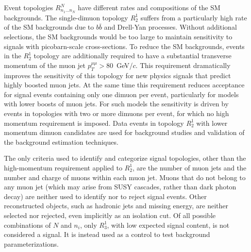 Event topologies $R^{N}_{n_1 ... n_N}$ have different rates and compositions of the SM backgrounds. The single-dimuon topology $R^1_2$ suffers from a particularly high rate of the SM backgrounds due to $b\bar{b}$ and Drell-Yan processes. Without additional selections, the SM backgrounds would be too large to maintain sensitivity to signals with picobarn-scale cross-sections. To reduce the SM backgrounds, events in the $R^1_2$ topology are additionally required to have a substantial transverse momentum of the muon jet $p_T^{\mu\mu}>80$~GeV/$c$. This requirement dramatically improves the sensitivity of this topology for new physics signals that predict highly boosted muon jets. At the same time this requirement reduces acceptance for signal events containing only one dimuon per event, particularly for models with lower boosts of muon jets. For such models the sensitivity is driven by events in topologies with two or more dimuons per event, for which no high momentum requirement is imposed. Data events in topology $R^1_2$ with lower momentum dimuon candidates are used for background studies and validation of the background estimation techniques. 

The only criteria used to identify and categorize signal topologies, other than the high-momentum requirement applied to $R^1_2$, are the number of muon jets and the number and charge of muons within each muon jet.  Muons that do not belong to any muon jet (which may arise from SUSY cascades, rather than dark photon decay) are neither used to identify nor to reject signal events.  Other reconstructed objects, such as hadronic jets and missing energy, are neither selected nor rejected, even implicitly as an isolation cut.  Of all possible combinations of $N$ and $n_i$, only $R^1_3$, with low expected signal content, is not considered a signal.  It is instead used as a control to test background parameterizations.


